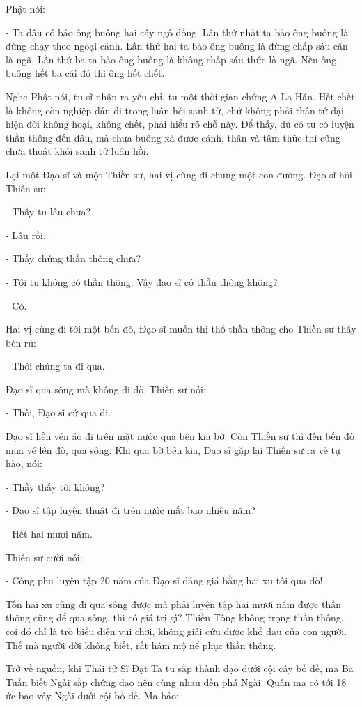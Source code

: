 \documentclass[
  12pt,
  oneside]{book}
\begin{document}
Phật nói:

- Ta đâu có bảo ông buông hai cây ngô đồng. Lần thứ nhất ta bảo ông buông là đừng chạy theo ngoại cảnh. Lần thứ hai ta bảo ông buông là đừng chấp sáu căn là ngã. Lần thứ ba ta bảo ông buông là không chấp sáu thức là ngã. Nếu ông buông hết ba cái đó thì ông hết chết.

Nghe Phật nói, tu sĩ nhận ra yếu chỉ, tu một thời gian chứng A La Hán. Hết chết là không còn nghiệp dẫn đi trong luân hồi sanh tử, chứ không phải thân tứ đại hiện đời không hoại, không chết, phải hiểu rõ chỗ này. Để thấy, dù có tu có luyện thần thông đến đâu, mà chưa buông xả được cảnh, thân và tâm thức thì cũng chưa thoát khỏi sanh tử luân hồi.

Lại một Đạo sĩ và một Thiền sư, hai vị cùng đi chung một con đường. Đạo sĩ hỏi Thiền sư:

- Thầy tu lâu chưa?

- Lâu rồi.

- Thầy chứng thần thông chưa?

- Tôi tu không có thần thông. Vậy đạo sĩ có thần thông không?

- Có.

Hai vị cùng đi tới một bến đò, Đạo sĩ muốn thi thố thần thông cho Thiền sư thấy bèn rủ:

- Thôi chúng ta đi qua.

Đạo sĩ qua sông mà không đi đò. Thiền sư nói:

- Thôi, Đạo sĩ cứ qua đi.

Đạo sĩ liền vén áo đi trên mặt nước qua bên kia bờ. Còn Thiền sư thì đến bến đò mua vé lên đò, qua sông. Khi qua bờ bên kia, Đạo sĩ gặp lại Thiền sư ra vẻ tự hào, nói:

- Thầy thấy tôi không?

- Đạo sĩ tập luyện thuật đi trên nước mất bao nhiêu năm?

- Hết hai mươi năm.

Thiền sư cười nói:

- Công phu luyện tập 20 năm của Đạo sĩ đáng giá bằng hai xu tôi qua đò!

Tốn hai xu cũng đi qua sông được mà phải luyện tập hai mươi năm được thần thông cũng để qua sông, thì có giá trị gì? Thiền Tông không trọng thần thông, coi đó chỉ là trò biểu diễn vui chơi, không giải cứu được khổ đau của con người. Thế mà người đời không biết, rất hâm mộ nể phục thần thông.

Trở về nguồn, khi Thái tử Sĩ Đạt Ta tu sắp thành đạo dưới cội cây bồ đề, ma Ba Tuần biết Ngài sắp chứng đạo nên cùng nhau đến phá Ngài. Quân ma có tới 18 ức bao vây Ngài dưới cội bồ đề. Ma bảo:
\end{document}
